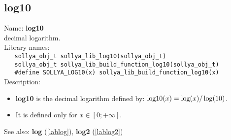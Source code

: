 \subsection{log10}
\label{lablog10}
\noindent Name: \textbf{log10}\\
\phantom{aaa}decimal logarithm.\\[0.2cm]
\noindent Library names:\\
\verb|   sollya_obj_t sollya_lib_log10(sollya_obj_t)|\\
\verb|   sollya_obj_t sollya_lib_build_function_log10(sollya_obj_t)|\\
\verb|   #define SOLLYA_LOG10(x) sollya_lib_build_function_log10(x)|\\[0.2cm]
\noindent Description: \begin{itemize}

\item \textbf{log10} is the decimal logarithm defined by: ${\rm log10}(x) = \log(x)/\log(10)$.

\item It is defined only for $x \in [0; +\infty]$.
\end{itemize}
See also: \textbf{log} (\ref{lablog}), \textbf{log2} (\ref{lablog2})
